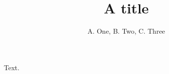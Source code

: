 \documentclass{article}
\title{A title}
\author{A. One\refaddr{la}, B. Two\refaddr{lb}, C. Three\refaddr{la, lb}}
\begin{document}
\maketitle
Text.
\end{document}
